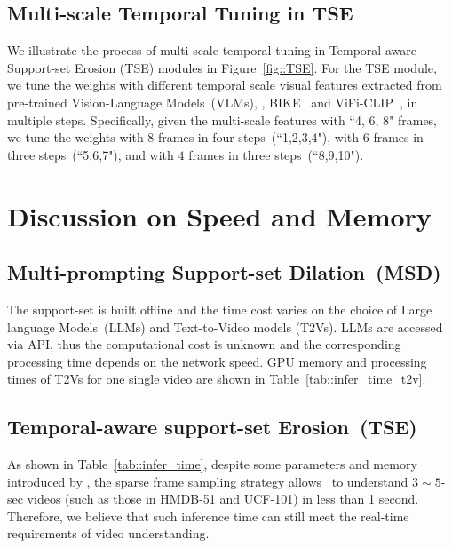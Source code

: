 {\subsection{Multi-scale Temporal Tuning in TSE}
{
We illustrate the process of multi-scale temporal tuning in Temporal-aware Support-set Erosion (TSE) modules in Figure~\ref{fig::TSE}. For the TSE module, we tune the weights with different temporal scale visual features extracted from pre-trained Vision-Language Models~(VLMs), \eg, BIKE~\cite{wu2023bidirectional} and ViFi-CLIP~\cite{hanoonavificlip}, in multiple steps. Specifically, given the multi-scale features with ``4, 6, 8" frames, we tune the weights with $8$ frames in four steps~(``1,2,3,4"), with $6$ frames in three steps~(``5,6,7"), and with $4$ frames in three steps~(``8,9,10"). 
}
}






\section{Discussion on Speed and Memory}{


\subsection{Multi-prompting Support-set Dilation~(MSD)}
The support-set is built offline and the time cost varies on the choice of Large language Models~(LLMs) and Text-to-Video models (T2Vs). LLMs are accessed via API, thus the computational cost is unknown and the corresponding processing time depends on the network speed. GPU memory and processing times of T2Vs for one single video are shown in Table~\ref{tab::infer_time_t2v}.


\subsection{Temporal-aware support-set Erosion~(TSE)}
As shown in Table~\ref{tab::infer_time}, despite some parameters and memory introduced by \testv, the sparse frame sampling strategy allows \testv~to understand $3 \sim 5$-sec videos (such as those in HMDB-51 and UCF-101) in less than 1 second. Therefore, we believe that such inference time can still meet the real-time requirements of video understanding.


}



